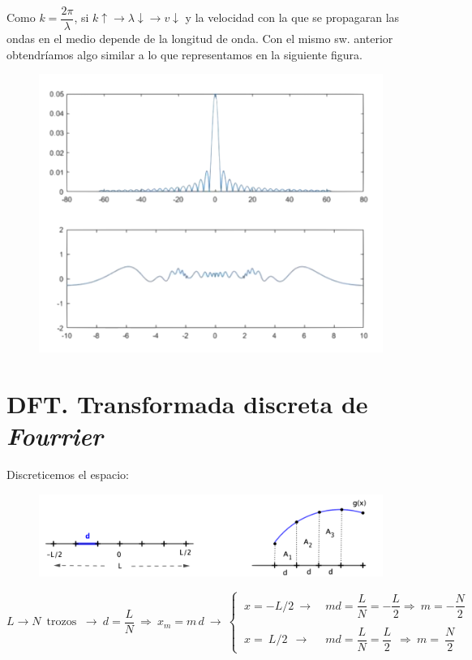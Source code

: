 \begin{example}
Como $k=\dfrac {2\pi}{\lambda}$, si $k \uparrow \to \lambda \downarrow \to v\downarrow$ y la velocidad con la que se propagaran las ondas en el medio depende de la longitud de onda. Con el mismo sw. anterior obtendríamos algo similar a lo que representamos en la siguiente figura.

\begin{figure}[H]
	\centering
	\includegraphics[width=.75\textwidth]{imagenes/apendices-DFT5.png}
\end{figure}
\vspace{2mm}

\end{example}




\section{DFT. Transformada discreta de \emph{Fourrier}}


Discreticemos el espacio:

\begin{figure}[H]
	\centering
	\includegraphics[width=.95\textwidth]{imagenes/apendices-DFT7.png}
\end{figure}
\vspace{2mm}

$L \to N \, \text{ trozos } \ \to \ d=\dfrac L N \  \Rightarrow \ x_m=m\, d \ \to \ \begin{cases} \ x=-L/2 \ \to & \ md=\dfrac LN = - \dfrac L 2  \Rightarrow \ m=-\dfrac N 2 \\  \\ \ x =\ L/2 \ \ \to & \ md=\dfrac LN = \dfrac L 2 \ \ \Rightarrow \ m =\ \dfrac N 2 \end{cases}$

